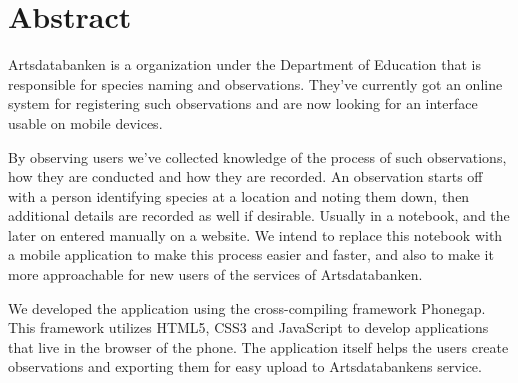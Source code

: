 \section{Abstract}

Artsdatabanken is a organization under the Department of Education that is
responsible for species naming and observations. They’ve currently got an online
system for registering such observations and are now looking for an interface
usable on mobile devices.

By observing users we’ve collected knowledge of the process of such
observations, how they are conducted and how they are recorded. An observation
starts off with a person identifying species at a location and noting them down,
then additional details are recorded as well if desirable. Usually in a
notebook, and the later on entered manually on a website. We intend to replace
this notebook with a mobile application to make this process easier and faster,
and also to make it more approachable for new users of the services of
Artsdatabanken.

We developed the application using the cross-compiling framework Phonegap. This
framework utilizes HTML5, CSS3 and JavaScript to develop applications that live
in the browser of the phone. The application itself helps the users create
observations and exporting them for easy upload to Artsdatabankens service. 
